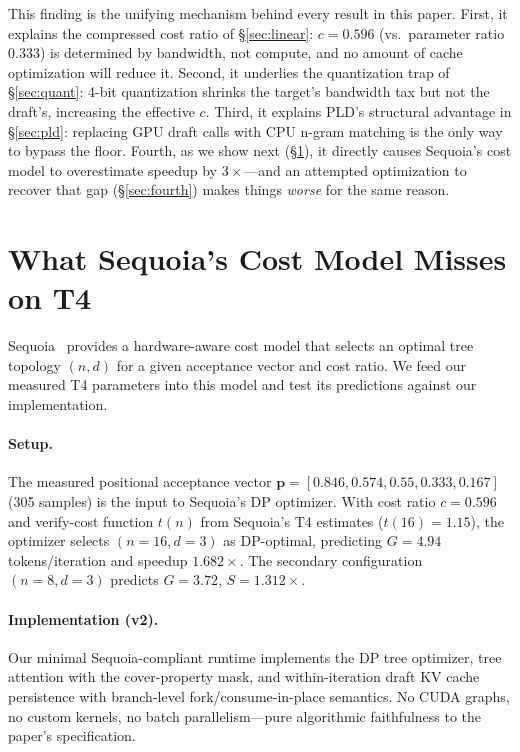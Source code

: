 \documentclass[letterpaper,twocolumn,10pt]{article}
\begin{document}
This finding is the unifying mechanism behind every result in this paper.
First, it explains the compressed cost ratio of \S\ref{sec:linear}: $c = 0.596$ (vs.\ parameter ratio $0.333$) is determined by bandwidth, not compute, and no amount of cache optimization will reduce it.
Second, it underlies the quantization trap of \S\ref{sec:quant}: 4-bit quantization shrinks the target's bandwidth tax but not the draft's, increasing the effective $c$.
Third, it explains PLD's structural advantage in \S\ref{sec:pld}: replacing GPU draft calls with CPU n-gram matching is the only way to bypass the floor.
Fourth, as we show next (\S\ref{sec:tree}), it directly causes Sequoia's cost model to overestimate speedup by $3\times$---and an attempted optimization to recover that gap (\S\ref{sec:fourth}) makes things \emph{worse} for the same reason.


\section{What Sequoia's Cost Model Misses on T4}
\label{sec:tree}

Sequoia~\cite{chen2024sequoia} provides a hardware-aware cost model that selects an optimal tree topology $(n, d)$ for a given acceptance vector and cost ratio.
We feed our measured T4 parameters into this model and test its predictions against our implementation.

\paragraph{Setup.}
The measured positional acceptance vector $\mathbf{p} = [0.846, 0.574, 0.55, 0.333, 0.167]$ (305 samples) is the input to Sequoia's DP optimizer.
With cost ratio $c = 0.596$ and verify-cost function $t(n)$ from Sequoia's T4 estimates ($t(16) = 1.15$), the optimizer selects $(n{=}16, d{=}3)$ as DP-optimal, predicting $G = 4.94$ tokens/iteration and speedup $1.682\times$.
The secondary configuration $(n{=}8, d{=}3)$ predicts $G = 3.72$, $S = 1.312\times$.

\paragraph{Implementation (v2).}
Our minimal Sequoia-compliant runtime implements the DP tree optimizer, tree attention with the cover-property mask, and within-iteration draft KV cache persistence with branch-level fork/consume-in-place semantics.
No CUDA graphs, no custom kernels, no batch parallelism---pure algorithmic faithfulness to the paper's specification.
\end{document}
